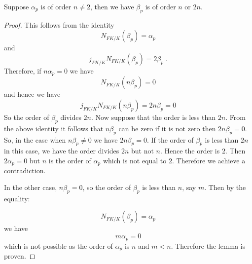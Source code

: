 \documentclass[10pt,a4paper]{amsart}
\begin{document}
\begin{lemma}
Suppose $\alpha_p$ is of order $n\neq 2$, then we have $\beta_p $ is of order $n$ or $2n$.
\end{lemma}

\begin{proof}
This follows from the identity
$$N_{FK/K}(\beta_p)=\alpha_p$$
and 
$$j_{FK/K}N_{FK/K}(\beta_p)=2\beta_p\;.$$
Therefore, if $n\alpha_p=0$ we have 
$$N_{FK/K}(n\beta_p)=0$$
and hence we have 
$$j_{FK/K}N_{FK/K}(n\beta_p)=2n\beta_p=0$$
So the order of $\beta_p$ divides $2n$. Now suppose that the order is less than $2n$. From the above identity it follows that $n\beta_p$ can be zero if it is not zero then $2n\beta_p=0$. So, in the case when $n\beta_p\neq 0$ we have $2n\beta_p=0$. If the order of $\beta_p$ is less than $2n$ in this case, we have the order divides $2n$ but not $n$. Hence the order is $2$. Then $2\alpha_p=0$ but $n$ is the order of $\alpha_p$ which is not equal to $2$. Therefore we achieve a contradiction. 

In the other case, $n\beta_p=0$, so the order of $\beta_p$ is less than $n$, say $m$. Then by the equality:

$$N_{FK/K}(\beta_p)=\alpha_p$$
we have
$$m\alpha_p=0$$
which is not possible as the order of $\alpha_p$ is $n$ and $m<n$. Therefore the lemma is proven.


\end{proof}
\end{document}
